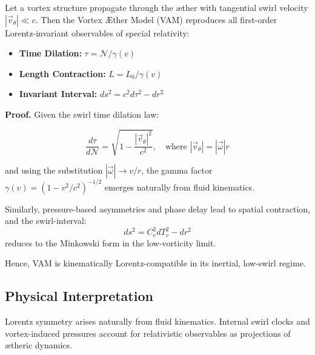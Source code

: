 \documentclass[12pt]{article}
\begin{document}
    \begin{theorem}
        Let a vortex structure propagate through the æther with tangential swirl velocity \( |\vec{v}_\theta| \ll c \). Then the Vortex Æther Model (VAM) reproduces all first-order Lorentz-invariant observables of special relativity:

        \begin{itemize}
            \item \textbf{Time Dilation:} \( \tau = \mathcal{N} / \gamma(v) \)
            \item \textbf{Length Contraction:} \( L = L_0 / \gamma(v) \)
            \item \textbf{Invariant Interval:} \( ds^2 = c^2 d\tau^2 - dr^2 \)
        \end{itemize}

        \textbf{Proof.}
        Given the swirl time dilation law:\\

        \begin{eqbox}
            \begin{equation}\label{eq:swirl-dilation}
            \frac{d\tau}{d\mathcal{N}} = \sqrt{1 - \frac{|\vec{v}_\theta|^2}{c^2}}, \quad \text{where } |\vec{v}_\theta| = |\vec{\omega}| r
            \end{equation}
        \end{eqbox}


        and using the substitution \( |\vec{\omega}| \to v/r \), the gamma factor \( \gamma(v) = \left(1 - v^2/c^2\right)^{-1/2} \) emerges naturally from fluid kinematics.

        Similarly, pressure-based asymmetries and phase delay lead to spatial contraction, and the swirl-interval:
        \[
            ds^2 = C_e^2 dT_v^2 - dr^2
        \]
        reduces to the Minkowski form in the low-vorticity limit.

        Hence, VAM is kinematically Lorentz-compatible in its inertial, low-swirl regime.
    \end{theorem}


    \subsection*{Physical Interpretation}
    Lorentz symmetry arises naturally from fluid kinematics. Internal swirl clocks and vortex-induced pressures account for relativistic observables as projections of ætheric dynamics.
\end{document}
